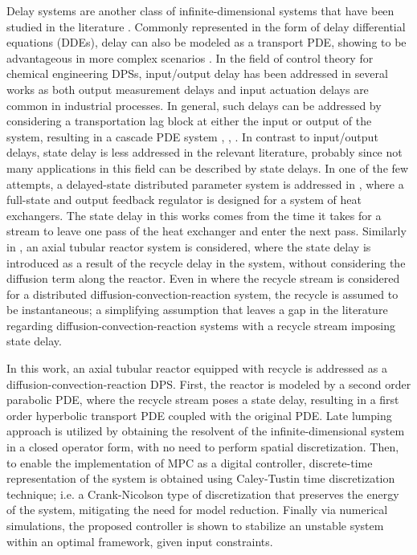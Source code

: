 Delay systems are another class of infinite-dimensional systems that have been studied in the literature \cite{curtainbook}. 
Commonly represented in the form of delay differential equations (DDEs), delay can also be modeled as a transport PDE, showing to be advantageous in more complex scenarios \cite{krstic2009book}. In the field of control theory for chemical engineering DPSs, input/output delay has been addressed in several works as both output measurement delays and input actuation delays are common in industrial processes. 
In general, such delays can be addressed by considering a transportation lag block at either the input or output of the system, resulting in a cascade PDE system \cite{Hiratsuka1969IEEE}, \cite{mohammadi2012lq}, \cite{Guilherme2019ACC}. In contrast to input/output delays, state delay is less addressed in the relevant literature, probably since not many applications in this field can be described by state delays. In one of the few attempts, a delayed-state distributed parameter system is addressed in \cite{ozorio2019heat}, where a full-state and output feedback regulator is designed for a system of heat exchangers. The state delay in this works comes from the time it takes for a stream to leave one pass of the heat exchanger and enter the next pass. Similarly in \cite{qi2021output}, an axial tubular reactor system is considered, where the state delay is introduced as a result of the recycle delay in the system, without considering the diffusion term along the reactor. Even in \cite{khatibi2021model} where the recycle stream is considered for a distributed diffusion-convection-reaction system, the recycle is assumed to be instantaneous; a simplifying assumption that leaves a gap in the literature regarding diffusion-convection-reaction systems with a recycle stream imposing state delay.

In this work, an axial tubular reactor equipped with recycle is addressed as a diffusion-convection-reaction DPS. First, the reactor is modeled by a second order parabolic PDE, where the recycle stream poses a state delay, resulting in a first order hyperbolic transport PDE coupled with the original PDE. Late lumping approach is utilized by obtaining the resolvent of the infinite-dimensional system in a closed operator form, with no need to perform spatial discretization. Then, to enable the implementation of MPC as a digital controller, discrete-time representation of the system is obtained using Caley-Tustin time discretization technique; i.e. a Crank-Nicolson type of discretization that preserves the energy of the system, mitigating the need for model reduction. Finally via numerical simulations, the proposed controller is shown to stabilize an unstable system within an optimal framework, given input constraints.